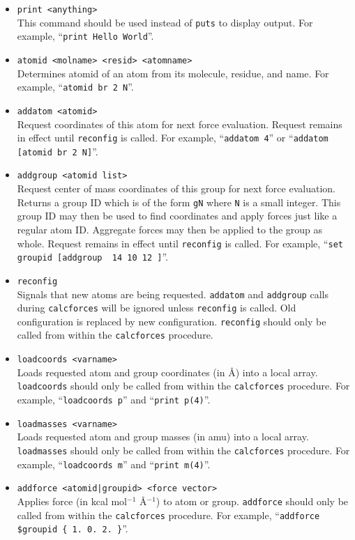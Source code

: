 \begin{itemize}

\item
{\tt print <anything>} \\
This command should be used instead of {\tt puts} to display output.
For example, ``\verb&print Hello World&''.

\item
{\tt atomid <molname> <resid> <atomname>} \\
Determines atomid of an atom from its molecule, residue, and name.
For example, ``{\tt atomid br 2 N}''.

\item
{\tt addatom <atomid>} \\
Request coordinates of this atom for next force evaluation.
Request remains in effect until {\tt reconfig} is called.
For example, ``{\tt addatom 4}'' or ``{\tt addatom [atomid br 2 N]}''.

\item
{\tt addgroup <atomid list>} \\
Request center of mass coordinates of this group for next force evaluation.
Returns a group ID which is of the form {\tt gN} where {\tt N} is a small integer.
This group ID may then be used to find coordinates and apply forces just like a regular atom ID.
Aggregate forces may then be applied to the group as whole.
Request remains in effect until {\tt reconfig} is called.
For example, ``{\tt set groupid [addgroup { 14 10 12 }]}''.

\item
{\tt reconfig} \\
Signals that new atoms are being requested.
{\tt addatom} and {\tt addgroup} calls during {\tt calcforces} will be ignored unless {\tt reconfig} is called.
Old configuration is replaced by new configuration.
{\tt reconfig} should only be called from within the {\tt calcforces} procedure.

\item
{\tt loadcoords <varname>} \\
Loads requested atom and group coordinates (in \AA) into a local array.
{\tt loadcoords} should only be called from within the {\tt calcforces} procedure.
For example, ``{\tt loadcoords p}'' and ``{\tt print p(4)}''.

\item
{\tt loadmasses <varname>} \\
Loads requested atom and group masses (in amu) into a local array.
{\tt loadmasses} should only be called from within the {\tt calcforces} procedure.
For example, ``{\tt loadcoords m}'' and ``{\tt print m(4)}''.

\item
{\tt addforce <atomid|groupid> <force vector>} \\
Applies force (in kcal mol$^{-1}$ \AA$^{-1}$) to atom or group.
{\tt addforce} should only be called from within the {\tt calcforces} procedure.
For example, ``\verb!addforce $groupid { 1. 0. 2. }!''.

\end{itemize}

